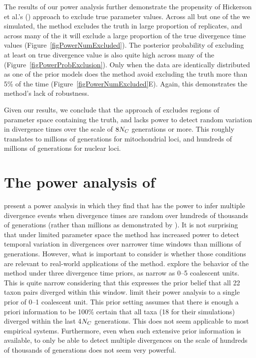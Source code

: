\documentclass[letterpaper,12pt]{article}
\begin{document}
\begin{linenumbers}
The results of our power analysis further demonstrate the propensity of
Hickerson et al.'s (\citeyear{Hickerson2013}) approach to exclude true parameter
values.
Across all but one of the  we simulated, the method excludes the
truth in large proportion of replicates, and across many of the  it
will exclude a large proportion of the true divergence time values
(Figure~\ref{figPowerNumExcluded}).
The posterior probability of excluding at least on true divergence value is
also quite high across many of the 
(Figure~\ref{figPowerProbExclusion}).
Only when the data are identically distributed as one of the prior models does
the method avoid excluding the truth more than 5\% of the time
(Figure~\ref{figPowerNumExcluded}E).
Again, this demonstrates the method's lack of robustness.

Given our results, we conclude that the approach of \citet{Hickerson2013}
excludes regions of parameter space containing the truth, and lacks power to
detect random variation in divergence times over the scale of $8N_C$
generations or more.
This roughly translates to millions of generations for mitochondrial loci, and
hundreds of millions of generations for nuclear loci.


\section*{The power analysis of \citet{Hickerson2013}}
\citet{Hickerson2013} present a power analysis in which they find that
\msb has the power to infer multiple divergence events when divergence times
are random over hundreds of thousands of generations (rather than millions as
demonstrated by \citet{Oaks2012}).
It is not surprising that under limited parameter space the method has
increased power to detect temporal variation in divergences over narrower time
windows than millions of generations.
However, what is important to consider is whether those conditions are relevant
to real-world applications of the method.
\citet{Oaks2012} explore the behavior of the method under three divergence time
priors, as narrow as 0--5 coalescent units. This is quite narrow considering
that this expresses the prior belief that all 22 taxon pairs diverged within
this window.
\citet{Hickerson2013} limit their power analysis to a single prior of 0--1
coalescent unit.
This prior setting assumes that there is enough a priori information to
be 100\% certain that all taxa (18 for their simulations) diverged within
the last 4$N_C$ generations.
This does not seem applicable to most empirical systems.
Furthermore, even when such extensive prior information is available, to only
be able to detect multiple divergences on the scale of hundreds of thousands of
generations does not seem very powerful.


\end{linenumbers}
\end{document}
